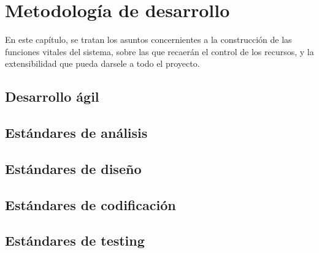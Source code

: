 \chapter{Metodología de desarrollo}

En este capítulo, se tratan los asuntos concernientes a la construcción de las
funciones vitales del sistema, sobre las que recaerán el control de los
recursos, y la extensibilidad que pueda darsele a todo el proyecto.

\section{Desarrollo ágil}
\section{Estándares de análisis}
\section{Estándares de diseño}
\section{Estándares de codificación}
\section{Estándares de testing}
